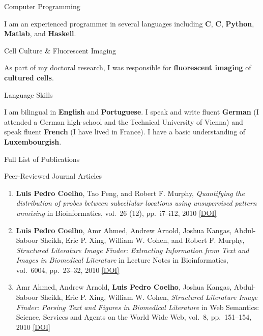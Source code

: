 \documentclass{article}
\renewcommand\section[1]{%
    \par\vspace{2em}\penalty-100%
    {\subhead #1}%
    \par\penalty100\vspace{1em}\penalty100%
}
\renewcommand\subsection[1]{%
    \par\vspace{.1em}%
    {\hspace{1em}\subsubhead #1}%
    \par\vspace{.2em}%
}
\newcommand\cvitem[2][\relax]{%
    \par\vspace{.8em}
    \if\relax#1\else{\Date \textcolor{medg}{#1}}\hspace{1em}\fi%
    {\CvItem #2}%
    \par\vspace{.4em}
}
\newcommand\showdoi[1]{%
    \href{http://dx.doi.org/#1}{[DOI]}%
}
\begin{document}
\cvitem{Computer Programming}
I am an experienced programmer in several languages including \textbf{C},
\textbf{C\raisebox{.2em}{\tiny \bf ++}}, \textbf{Python}, \textbf{Matlab}, and
\textbf{Haskell}.

\cvitem{Cell Culture \& Fluorescent Imaging}
As part of my doctoral research, I was responsible for \textbf{fluorescent
imaging} of \textbf{cultured cells}.

\cvitem{Language Skills}
I am bilingual in \textbf{English} and \textbf{Portuguese}. I speak and write
fluent \textbf{German} (I attended a German high-school and the Technical
University of Vienna) and speak fluent \textbf{French} (I have lived in
France). I have a basic understanding of \textbf{Luxembourgish}.

\pagebreak
\section{Full List of Publications}

\subsection{Peer-Reviewed Journal Articles}
\begin{enumerate}
\item \textbf{Luis Pedro Coelho}, Tao Peng, and Robert F. Murphy,
\emph{Quantifying the distribution of probes between subcellular locations
using unsupervised pattern unmixing} in Bioinformatics, vol.\ 26 (12), pp.\
i7--i12, 2010 \showdoi{10.1093/bioinformatics/btq220}

\item \textbf{Luis Pedro Coelho}, Amr Ahmed, Andrew Arnold, Joshua Kangas,
Abdul-Saboor Sheikh, Eric P. Xing, William W. Cohen, and Robert F. Murphy,
\emph{Structured Literature Image Finder: Extracting Information from Text and
Images in Biomedical Literature} in Lecture Notes in Bioinformatics, vol.\
6004, pp.\ 23--32, 2010 \showdoi{10.1007/978-3-642-13131-8_4}

\item Amr Ahmed, Andrew Arnold, \textbf{Luis Pedro Coelho}, Joshua Kangas,
Abdul-Saboor Sheikk, Eric P. Xing, William W. Cohen, \emph{Structured
Literature Image Finder: Parsing Text and Figures in Biomedical Literature} in
Web Semantics: Science, Services and Agents on the World Wide Web, vol.\ 8,
pp.\ 151--154, 2010 \showdoi{10.1016/j.websem.2010.04.002}

\end{enumerate}
\end{document}
